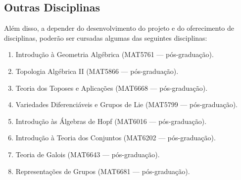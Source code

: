 \documentclass[11pt,reqno]{amsart}
\theoremstyle{definition}
\begin{document}
\subsection{Outras Disciplinas}
Além disso, a depender do desenvolvimento do projeto e do oferecimento de
disciplinas, poderão ser cursadas algumas das seguintes disciplinas:
\begin{enumerate}[1.]
\item Introdução à Geometria Algébrica (MAT5761 --- pós-graduação).
\item Topologia Algébrica II (MAT5866 --- pós-graduação).
\item Teoria dos Toposes e Aplicações (MAT6668 --- pós-graduação).
\item Variedades Diferenciáveis e Grupos de Lie (MAT5799 --- pós-graduação).
\item Introdução às Álgebras de Hopf (MAT6016 --- pós-graduação).
\item Introdução à Teoria dos Conjuntos (MAT6202 --- pós-graduação).
\item Teoria de Galois (MAT6643 --- pós-graduação).
\item Representações de Grupos (MAT6681 --- pós-graduação).
\end{enumerate}

\printbibliography
\end{document}
